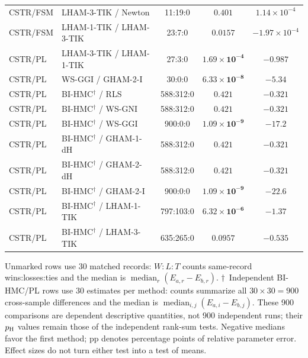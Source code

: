 \begin{table}[!htbp]
\begin{tabular}{@{}llccc@{}}
CSTR/FSM & LHAM-3-TIK / Newton & 11:19:0 & $0.401$ & $1.14\times10^{-4}$ \\
CSTR/FSM & LHAM-1-TIK / LHAM-3-TIK & 23:7:0 & $\mathbf{0.0157}$ & $-1.97\times10^{-4}$ \\
CSTR/PL & LHAM-3-TIK / LHAM-1-TIK & 27:3:0 & $\mathbf{1.69\times10^{-4}}$ & $-0.987$ \\
CSTR/PL & WS-GGI / GHAM-2-I & 30:0:0 & $\mathbf{6.33\times10^{-8}}$ & $-5.34$ \\
CSTR/PL & BI-HMC$^\dagger$ / RLS & 588:312:0 & $0.421$ & $-0.321$ \\
CSTR/PL & BI-HMC$^\dagger$ / WS-GNI & 588:312:0 & $0.421$ & $-0.321$ \\
CSTR/PL & BI-HMC$^\dagger$ / WS-GGI & 900:0:0 & $\mathbf{1.09\times10^{-9}}$ & $-17.2$ \\
CSTR/PL & BI-HMC$^\dagger$ / GHAM-1-dH & 588:312:0 & $0.421$ & $-0.321$ \\
CSTR/PL & BI-HMC$^\dagger$ / GHAM-2-dH & 588:312:0 & $0.421$ & $-0.321$ \\
CSTR/PL & BI-HMC$^\dagger$ / GHAM-2-I & 900:0:0 & $\mathbf{1.09\times10^{-9}}$ & $-22.6$ \\
CSTR/PL & BI-HMC$^\dagger$ / LHAM-1-TIK & 797:103:0 & $\mathbf{6.32\times10^{-6}}$ & $-1.37$ \\
CSTR/PL & BI-HMC$^\dagger$ / LHAM-3-TIK & 635:265:0 & $0.0957$ & $-0.535$ \\
\bottomrule
\end{tabular}
\par\smallskip
\begin{minipage}{\linewidth}\footnotesize
Unmarked rows use 30 matched records: $W:L:T$ counts same-record wins:losses:ties and the median is $\operatorname{median}_r(E_{a,r}-E_{b,r})$. $\dagger$~Independent BI-HMC/PL rows use 30 estimates per method: counts summarize all $30\times30=900$ cross-sample differences and the median is $\operatorname{median}_{i,j}(E_{a,i}-E_{b,j})$. These 900 comparisons are dependent descriptive quantities, not 900 independent runs; their $p_{\rm H}$ values remain those of the independent rank-sum tests. Negative medians favor the first method; pp denotes percentage points of relative parameter error. Effect sizes do not turn either test into a test of means.
\end{minipage}
\end{table}
